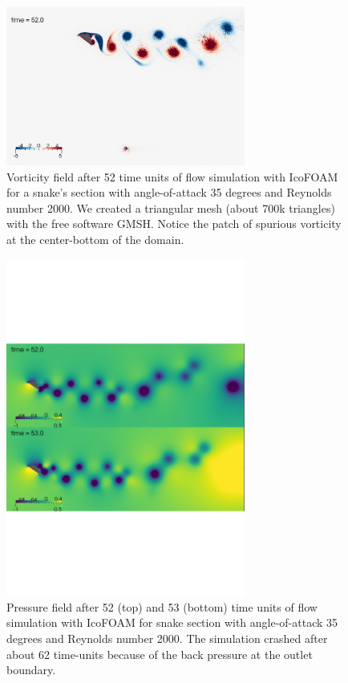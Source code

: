 \documentclass[9pt,twocolumn,twoside]{article}
\begin{document}
\begin{figure}
\centering
\includegraphics[width=0.7\textwidth]{./figures/openfoam_vorticity52Re2000AoA35_gmshZeroGradient.pdf}
\caption{
Vorticity field after 52 time units of flow simulation with IcoFOAM for a snake's section with angle-of-attack 35 degrees and Reynolds number 2000.
We created a triangular mesh (about 700k triangles) with the free software GMSH. 
Notice the patch of spurious vorticity at the center-bottom of the domain.
}
\label{figure1}
\end{figure}


\begin{figure}
\centering
\includegraphics[width=0.7\textwidth]{./figures/openfoam_pressureRe2000AoA35_gmshZeroGradient.pdf}
\caption{
Pressure field after 52 (top) and 53 (bottom) time units of flow simulation with IcoFOAM for snake section with angle-of-attack 35 degrees and Reynolds number 2000.
The simulation crashed after about 62 time-units because of the back pressure at the outlet boundary.
}
\label{figure2}
\end{figure}
\end{document}

